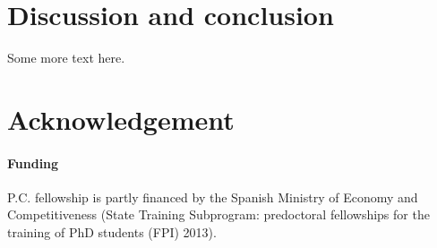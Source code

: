 \documentclass{bioinfo}
\begin{document}

\section{Discussion and conclusion}
Some more text here.

\section*{Acknowledgement}

\paragraph{Funding\textcolon}
P.C. fellowship is partly financed by the Spanish Ministry of Economy and
Competitiveness (State Training Subprogram: predoctoral fellowships for the
training of PhD students (FPI) 2013).



\end{document}
